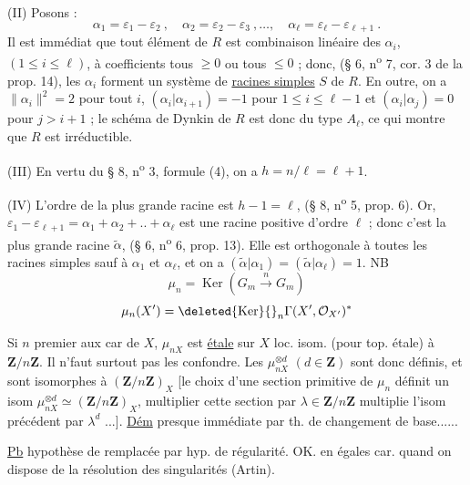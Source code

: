 (II) Posons :
\[
\alpha_1=\varepsilon_1-\varepsilon_2\ ,\quad
\alpha_2=\varepsilon_2-\varepsilon_3\ ,\ldots,\quad
\alpha_\ell=\varepsilon_\ell-\varepsilon_{\ell+1}\ .
\]
Il est immédiat que tout élément de $R$ est combinaison linéaire des $\alpha_i$, $(1\leq i\leq\ell)$, à coefficients tous $\geq0$ ou tous $\leq0$ ; donc, (§ 6, n\textsuperscript{o} 7, cor. 3 de la prop. 14), les $\alpha_i$ forment un système de \uline{racines simples} $S$ de $R$. En outre, on a $\|\alpha_i\|^2=2$ pour tout $i$, $(\alpha_i|\alpha_{i+1})=-1$ pour $1\leq i\leq\ell-1$ et $(\alpha_i|\alpha_j)=0$ pour $j>i+1$ ; le schéma de Dynkin de $R$ est donc du type $A_\ell$, ce qui montre que $R$ est irréductible.

(III) En vertu du § 8, n\textsuperscript{o} 3, formule (4), on a $h=n/\ell=\ell+1$.

(IV) L'ordre de la plus grande racine est $h-1=\ell$, (§ 8, n\textsuperscript{o} 5, prop. 6). Or, $\varepsilon_1-\varepsilon_{\ell+1}=\alpha_1+\alpha_2+..+\alpha_\ell$ est une racine positive d'ordre $\ell$ ; donc c'est la plus grande racine $\widetilde\alpha$, (§ 6, n\textsuperscript{o} 6, prop. 13). Elle est orthogonale à toutes les racines simples sauf à $\alpha_1$ et $\alpha_\ell$, et on a $(\widetilde\alpha|\alpha_1)=(\widetilde\alpha|\alpha_\ell)=1$.
NB
\[
\mu_n=\operatorname{Ker}(G_m\xrightarrow{n}G_m)
\]
\[
\mu_n(X')=\deleted{\operatorname{Ker}}{}_n\Gamma(X',\mathcal O_{X'})^*
\]

Si $n$ premier aux car de $X$, $\mu_{nX}$ est \uline{étale} sur $X$ loc. isom. (pour top. étale) à $\mathbf Z/n\mathbf Z$. Il n'faut surtout pas les confondre. Les $\mu_{nX}^{\otimes d}$ $(d\in\mathbf Z)$ sont donc définis, et sont  isomorphes à $(\mathbf Z/n\mathbf Z)_X$ [le choix d'une section primitive de $\mu_n$ définit un isom $\mu_{nX}^{\otimes d}\simeq(\mathbf Z/n\mathbf Z)_X$, multiplier cette section par $\lambda\in\mathbf Z/n\mathbf Z$ multiplie l'isom précédent par $\lambda^d$ ...]. \uline{Dém} presque immédiate par th. de changement de base......

\uline{Pb}   hypothèse de  remplacée par hyp. de régularité. OK.  en égales car. quand on dispose de la résolution des singularités (Artin).

